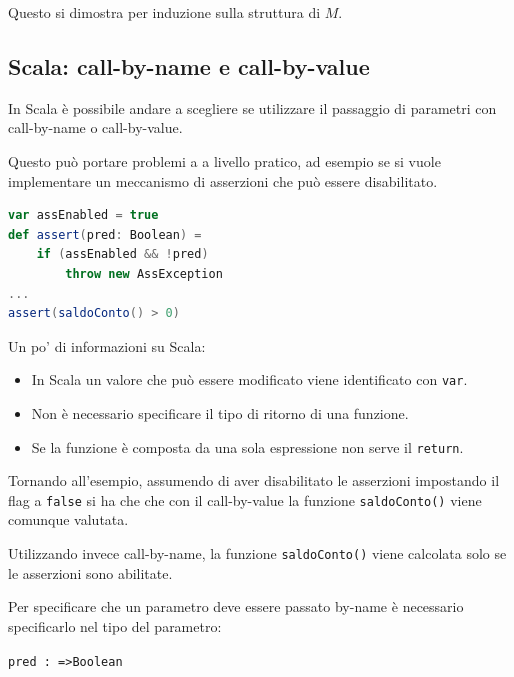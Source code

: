 Questo si dimostra per induzione sulla struttura di $M$. 

\subsection{Scala: call-by-name e call-by-value}

In Scala è possibile andare a scegliere se utilizzare il passaggio di parametri con call-by-name o call-by-value.

Questo può portare problemi a a livello pratico, ad esempio se si vuole implementare un meccanismo di asserzioni che può essere disabilitato.

\begin{lstlisting}[language=Scala]
var assEnabled = true
def assert(pred: Boolean) = 
	if (assEnabled && !pred)
		throw new AssException
...
assert(saldoConto() > 0)
\end{lstlisting}

\noindent Un po' di informazioni su Scala:
\begin{itemize}
	\item In Scala un valore che può essere modificato viene identificato con \texttt{var}.
	\item Non è necessario specificare il tipo di ritorno di una funzione.
	\item Se la funzione è composta da una sola espressione non serve il \texttt{return}.
\end{itemize}

\noindent Tornando all'esempio, assumendo di aver disabilitato le asserzioni impostando il flag a \texttt{false} si ha che che con il call-by-value la funzione \texttt{saldoConto()} viene comunque valutata.

Utilizzando invece call-by-name, la funzione \texttt{saldoConto()} viene calcolata solo se le asserzioni sono abilitate.

Per specificare che un parametro deve essere passato by-name è necessario specificarlo nel tipo del parametro:

\begin{center}
\texttt{pred : =>Boolean}
\end{center}